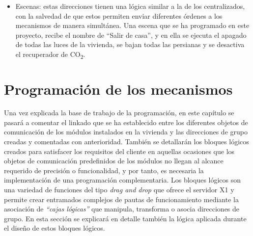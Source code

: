 \begin{itemize}
\item Escenas: estas direcciones tienen una lógica similar a la de los centralizados, con la salvedad de que estos permiten enviar diferentes órdenes a los mecanismos de manera simultánea. Una escena que se ha programado en este proyecto, recibe el nombre de “Salir de casa”, y en ella se ejecuta el apagado de todas las luces de la vivienda, se bajan todas las persianas y se desactiva el recuperador de CO\textsubscript{2}.
\end{itemize} 

\section{Programación de los mecanismos}
\label{sec:prog}

Una vez explicada la base de trabajo de la programación, en este capítulo se pasará a comentar el linkado que se ha establecido entre los diferentes objetos de comunicación de los módulos instalados en la vivienda y las direcciones de grupo creadas y comentadas con anterioridad. También se detallarán los bloques lógicos creados para satisfacer los requisitos del cliente en aquellas ocasiones que los objetos de comunicación predefinidos de los módulos no llegan al alcance requerido de precisión o funcionalidad, y por tanto, es necesaria la implementación de una programación complementaria. Los bloques lógicos son una variedad de funciones del tipo \textit {drag and drop} que ofrece el servidor X1 y permite crear entramados complejos de pautas de funcionamiento mediante la asociación de \textit {“cajas lógicas”} que manipula, transforma o asocia direcciones de grupo. En esta sección se explicará en detalle también la lógica aplicada durante el diseño de estos bloques lógicos.

